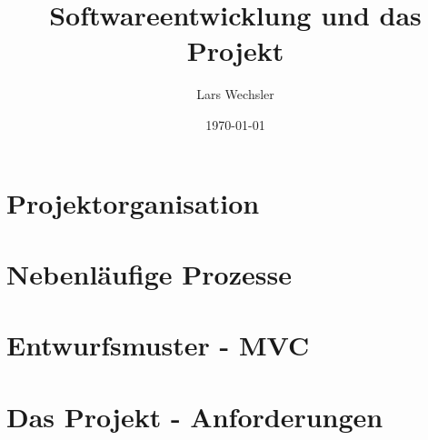 \documentclass{article}
\author{Lars Wechsler}
\title{Softwareentwicklung und \textbf{das Projekt}}
\date{\today}
\begin{document}
\maketitle
\newpage
\tableofcontents
\newpage 

\section{Projektorganisation}


\newpage

\section{Nebenläufige Prozesse}


\newpage

\section{Entwurfsmuster - MVC}


\newpage 

\section{Das Projekt - Anforderungen}

\end{document}
